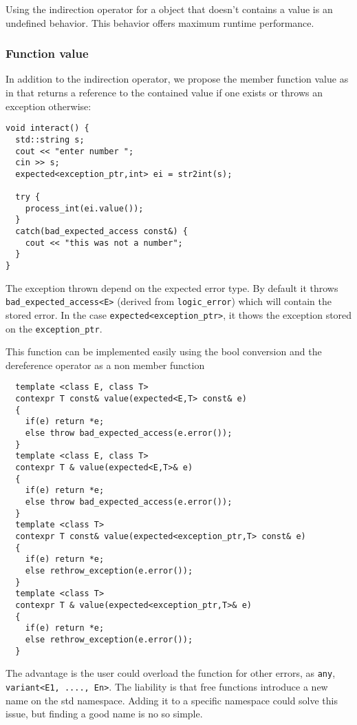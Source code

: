 \documentclass[a4paper,10pt]{article}
\newcommand{\cpp}[1]{\lstinline{#1}}
\begin{document}
Using the indirection operator for a object that doesn't contains a value is an undefined behavior. This behavior offers maximum runtime performance.

\subsubsection{Function value}

In addition to the indirection operator, we propose the member function value as in \cite{OptionalRev4} that returns a reference to the contained value if one exists or throws an exception otherwise:

\begin{lstlisting}
void interact() {
  std::string s;
  cout << "enter number ";
  cin >> s;
  expected<exception_ptr,int> ei = str2int(s);
  
  try {
    process_int(ei.value());
  }
  catch(bad_expected_access const&) {
    cout << "this was not a number";
  }
}
\end{lstlisting}

The exception thrown depend on the expected error type. By default it throws \cpp{bad_expected_access<E>} (derived from \cpp{logic_error}) which will contain the stored error. In the case \cpp{expected<exception_ptr>}, it thows the exception stored on the \cpp{exception_ptr}.

This function can be implemented easily using the bool conversion and the dereference operator as a non member function

\begin{lstlisting}
  template <class E, class T>
  contexpr T const& value(expected<E,T> const& e)
  {
    if(e) return *e;
    else throw bad_expected_access(e.error());
  }
  template <class E, class T>
  contexpr T & value(expected<E,T>& e)
  {
    if(e) return *e;
    else throw bad_expected_access(e.error());
  }
  template <class T>
  contexpr T const& value(expected<exception_ptr,T> const& e)
  {
    if(e) return *e;
    else rethrow_exception(e.error());
  }
  template <class T>
  contexpr T & value(expected<exception_ptr,T>& e)
  {
    if(e) return *e;
    else rethrow_exception(e.error());
  }
\end{lstlisting}

The advantage is the user could overload the function for other errors, as \cpp{any}, \cpp{variant<E1, ...., En>}. The liability is that free functions introduce a new name on the std namespace. Adding it to a specific namespace could solve this issue, but finding a good name is no so simple.
\end{document}
